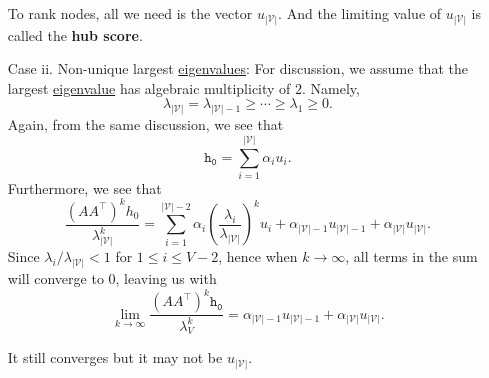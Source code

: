 \begin{enumerate}
		\begin{remark}
			To rank nodes, all we need is the vector \(u_{\left\vert \mathcal{V} \right\vert }\). And the limiting value of \(u_{\left\vert \mathcal{V} \right\vert }\) is called the \textbf{hub score}.
		\end{remark}
	\item[Case ii.] Non-unique largest \hyperref[def:eigenvalue]{eigenvalues}: For discussion, we assume that the largest \hyperref[def:eigenvalue]{eigenvalue} has algebraic multiplicity of \(2\). Namely,
		\[
			\lambda_{\left\vert \mathcal{V} \right\vert } = \lambda_{\left\vert \mathcal{V} \right\vert -1} \geq \cdots \geq \lambda_{1}\geq 0.
		\]
		Again, from the same discussion, we see that
		\[
			\mathtt{h_{0}} = \sum\limits_{i=1}^{\left\vert \mathcal{V} \right\vert } \alpha_{i}u_{i}.
		\]
		Furthermore, we see that
		\[
			\frac{\left(A A^{\top}\right)^k h_0}{\lambda_{\left\vert \mathcal{V} \right\vert }^k}
			= \sum\limits_{i=1}^{\left\vert \mathcal{V} \right\vert - 2} \alpha_{i}\left(\frac{\lambda_{i}}{\lambda_{\left\vert \mathcal{V} \right\vert }}\right)^k u_{i}
			+ \alpha_{\left\vert \mathcal{V} \right\vert -1}u_{\left\vert \mathcal{V} \right\vert -1}+\alpha_{\left\vert \mathcal{V} \right\vert } u_{\left\vert \mathcal{V} \right\vert }.
		\]
		Since \(\lambda_{i}/\lambda_{\left\vert \mathcal{V} \right\vert }< 1\) for \(1\leq i\leq V-2\), hence when \(k\to \infty \), all terms in the sum will converge to \(0\), leaving us with
		\[
			\lim_{k \to \infty} \frac{(A A^{\top})^{k}\mathtt{h_0}}{\lambda_V^k} = \alpha_{\left\vert \mathcal{V} \right\vert -1}u_{\left\vert \mathcal{V} \right\vert -1}
			+ \alpha_{\left\vert \mathcal{V} \right\vert } u_{\left\vert \mathcal{V} \right\vert }.
		\]
		\begin{remark}
			It still converges but it may not be \(u_{\left\vert \mathcal{V} \right\vert }\).
		\end{remark}
\end{enumerate}